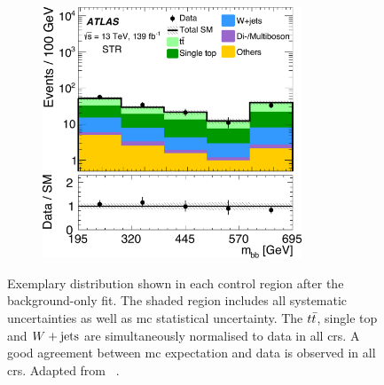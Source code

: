 \begin{figure}
\begin{subfigure}[b]{0.5\linewidth}
		\centering\includegraphics[width=0.85\textwidth]{fig_02e_yellow}
	\end{subfigure}\hfill

	\caption{Exemplary distribution shown in each control region after the background-only fit. The shaded region includes all systematic uncertainties as well as \gls{mc} statistical uncertainty. The $t\bar{t}$, single top and $W+\mathrm{jets}$ are simultaneously normalised to data in all \glspl{cr}. A good agreement between \gls{mc} expectation and data is observed in all \glspl{cr}. Adapted from ~\cite{SUSY-2019-08}.}
	\label{fig:CR_distributions_postfit}
\end{figure}



